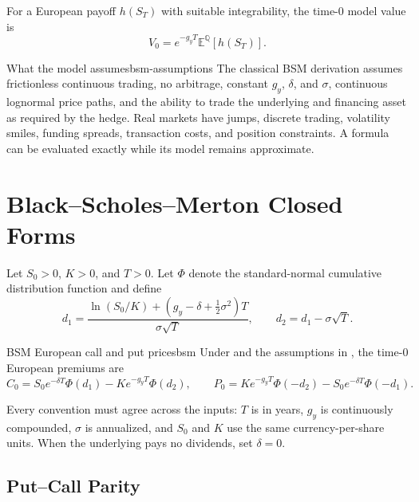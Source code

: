\documentclass[11pt]{article}
\begin{document}
For a European payoff $h(S_T)$ with suitable integrability, the time-$0$ model value is
\begin{equation}
  \label{eq:risk-neutral-price}
  V_0=e^{-g_yT}\mathbb E^{\mathbb Q}[h(S_T)].
\end{equation}

\begin{remark}{What the model assumes}{bsm-assumptions}
The classical BSM derivation assumes frictionless continuous trading, no arbitrage, constant $g_y$, $\delta$, and $\sigma$, continuous lognormal price paths, and the ability to trade the underlying and financing asset as required by the hedge. Real markets have jumps, discrete trading, volatility smiles, funding spreads, transaction costs, and position constraints. A formula can be evaluated exactly while its model remains approximate.
\end{remark}

\section{Black--Scholes--Merton Closed Forms}

Let $S_0>0$, $K>0$, and $T>0$. Let $\Phi$ denote the standard-normal cumulative distribution function and define
\begin{equation}
  \label{eq:d1-d2}
  d_1=\frac{\ln(S_0/K)+(g_y-\delta+\tfrac12\sigma^2)T}{\sigma\sqrt T},
  \qquad
  d_2=d_1-\sigma\sqrt T.
\end{equation}

\begin{theorem}{BSM European call and put prices}{bsm}
Under  and the assumptions in , the time-$0$ European premiums are
\begin{equation}
  \label{eq:bsm-prices}
  C_0=S_0e^{-\delta T}\Phi(d_1)-Ke^{-g_yT}\Phi(d_2),
  \qquad
  P_0=Ke^{-g_yT}\Phi(-d_2)-S_0e^{-\delta T}\Phi(-d_1).
\end{equation}
\end{theorem}

Every convention must agree across the inputs: $T$ is in years, $g_y$ is continuously compounded, $\sigma$ is annualized, and $S_0$ and $K$ use the same currency-per-share units. When the underlying pays no dividends, set $\delta=0$.

\subsection{Put--Call Parity}
\end{document}
